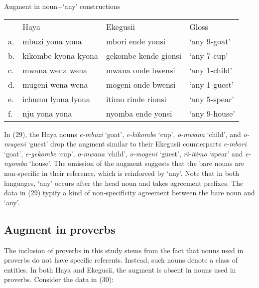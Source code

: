 \documentclass[output=paper]{langscibook}
\begin{document}
\begin{exe}
\ex Augment in noun+‘any’ constructions \\
\label{hayagusii29}
\begin{tabular}{llll}
      &       Haya		&		Ekegusii	&		Gloss	\\	 
a. &	mbuzi yona yona	&	mbori ende yonsi	&	‘any 9-goat’   \\		
b. &	kikombe kyona kyona &	gekombe kende gionsi	&	‘any 7-cup’\\
c. &	mwana wena wena	&	mwana onde bwensi	&	‘any 1-child’	\\
d. &	mugeni wena wena &		mogeni onde bwensi	&	‘any 1-guest’\\
e. &	ichumu lyona lyona	&	itimo rinde rionsi	&	‘any 5-spear’\\
f. &	nju yona yona	&		nyomba ende yonsi	&	‘any 9-house’\\

\end{tabular}
\end{exe}
In (29), the Haya nouns \textit{e-mbuzi} ‘goat’, \textit{e-kikombe} ‘cup’, \textit{o-mwana} ‘child’, and \textit{o-mugeni} ‘guest’ drop the augment similar to their Ekegusii counterparts \textit{e-mbori} ‘goat’, \textit{e-gekombe} ‘cup’, \textit{o-mwana} ‘child’, \textit{o-mogeni} ‘guest’, \textit{ri-itimo} ‘spear’ and \textit{e-nyomba} ‘house’. The omission of the augment suggests that the bare nouns are non-specific in their reference, which is reinforced by ‘any’. Note that in both languages, ‘any’ occurs after the head noun and takes agreement prefixes. The data in (29) typify a kind of non-specificity agreement between the bare noun and ‘any’.

\subsection{Augment in proverbs}
The inclusion of proverbs in this study stems from the fact that nouns used in proverbs do not have specific referents. Instead, such nouns denote a class of entities. In both Haya and Ekegusii, the augment is absent in nouns used in proverbs. Consider the data in (30):
\end{document}

